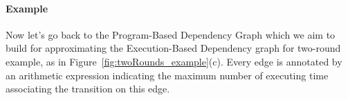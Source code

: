 \paragraph*{Example}
Now let's 
go back to the Program-Based Dependency Graph which we aim to build for approximating the 
Execution-Based Dependency graph for two-round example, as in
Figure~\ref{fig:twoRounds_example}(c).
Every edge is annotated by an arithmetic expression indicating the maximum number of executing time associating
the transition on this edge.

